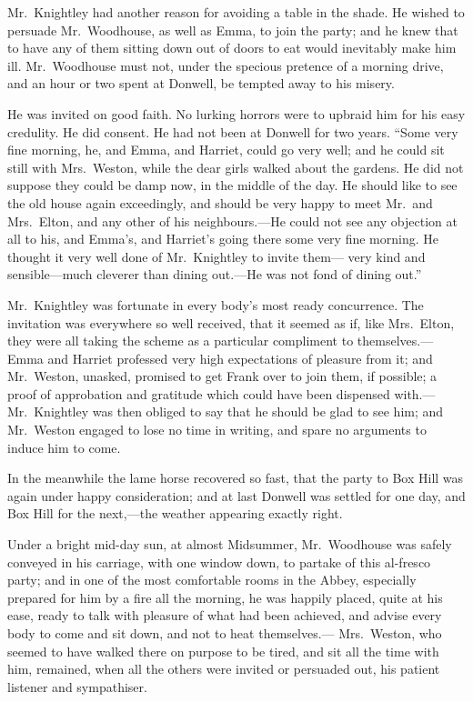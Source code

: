 Mr.\ Knightley had another reason for avoiding a table in the shade.
He wished to persuade Mr.\ Woodhouse, as well as Emma, to join the party;
and he knew that to have any of them sitting down out of doors
to eat would inevitably make him ill.  Mr.\ Woodhouse must not,
under the specious pretence of a morning drive, and an hour or two
spent at Donwell, be tempted away to his misery.

He was invited on good faith.  No lurking horrors were to upbraid
him for his easy credulity.  He did consent.  He had not been
at Donwell for two years.  ``Some very fine morning, he, and Emma,
and Harriet, could go very well; and he could sit still with
Mrs.\ Weston, while the dear girls walked about the gardens.
He did not suppose they could be damp now, in the middle of
the day.  He should like to see the old house again exceedingly,
and should be very happy to meet Mr.\ and Mrs.\ Elton, and any other
of his neighbours.---He could not see any objection at all to his,
and Emma's, and Harriet's going there some very fine morning.
He thought it very well done of Mr.\ Knightley to invite them---%
very kind and sensible---much cleverer than dining out.---He was not
fond of dining out.''

Mr.\ Knightley was fortunate in every body's most ready concurrence.
The invitation was everywhere so well received, that it seemed as if,
like Mrs.\ Elton, they were all taking the scheme as a particular
compliment to themselves.---Emma and Harriet professed very high
expectations of pleasure from it; and Mr.\ Weston, unasked,
promised to get Frank over to join them, if possible; a proof
of approbation and gratitude which could have been dispensed with.---%
Mr.\ Knightley was then obliged to say that he should be glad
to see him; and Mr.\ Weston engaged to lose no time in writing,
and spare no arguments to induce him to come.

In the meanwhile the lame horse recovered so fast, that the party
to Box Hill was again under happy consideration; and at last Donwell
was settled for one day, and Box Hill for the next,---the weather
appearing exactly right.

Under a bright mid-day sun, at almost Midsummer, Mr.\ Woodhouse
was safely conveyed in his carriage, with one window down,
to partake of this al-fresco party; and in one of the most
comfortable rooms in the Abbey, especially prepared for him by a
fire all the morning, he was happily placed, quite at his ease,
ready to talk with pleasure of what had been achieved, and advise
every body to come and sit down, and not to heat themselves.---%
Mrs.\ Weston, who seemed to have walked there on purpose to be tired,
and sit all the time with him, remained, when all the others
were invited or persuaded out, his patient listener and sympathiser.

